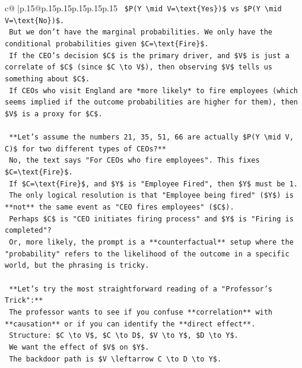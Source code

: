 \documentclass{article}
\begin{document}
{\begin{supertabular}{c@{$\;$}|p{.15\linewidth}@{}p{.15\linewidth}p{.15\linewidth}p{.15\linewidth}p{.15\linewidth}p{.15\linewidth}}
{{{\texttt{    \$P(Y \textbackslash{}mid V=\textbackslash{}text\{Yes\})\$ vs \$P(Y \textbackslash{}mid V=\textbackslash{}text\{No\})\$.} \\
\texttt{    But we don't have the marginal probabilities. We only have the conditional probabilities given \$C=\textbackslash{}text\{Fire\}\$.} \\
\texttt{    If the CEO's decision \$C\$ is the primary driver, and \$V\$ is just a correlate of \$C\$ (since \$C \textbackslash{}to V\$), then observing \$V\$ tells us something about \$C\$.} \\
\texttt{    If CEOs who visit England are *more likely* to fire employees (which seems implied if the outcome probabilities are higher for them), then \$V\$ is a proxy for \$C\$.} \\
\\ 
\texttt{    **Let's assume the numbers 21, 35, 51, 66 are actually \$P(Y \textbackslash{}mid V, C)\$ for two different types of CEOs?**} \\
\texttt{    No, the text says "For CEOs who fire employees". This fixes \$C=\textbackslash{}text\{Fire\}\$.} \\
\texttt{    If \$C=\textbackslash{}text\{Fire\}\$, and \$Y\$ is "Employee Fired", then \$Y\$ must be 1.} \\
\texttt{    The only logical resolution is that "Employee being fired" (\$Y\$) is **not** the same event as "CEO fires employees" (\$C\$).} \\
\texttt{    Perhaps \$C\$ is "CEO initiates firing process" and \$Y\$ is "Firing is completed"?} \\
\texttt{    Or, more likely, the prompt is a **counterfactual** setup where the "probability" refers to the likelihood of the outcome in a specific world, but the phrasing is tricky.} \\
\\ 
\texttt{    **Let's try the most straightforward reading of a "Professor's Trick":**} \\
\texttt{    The professor wants to see if you confuse **correlation** with **causation** or if you can identify the **direct effect**.} \\
\texttt{    Structure: \$C \textbackslash{}to V\$, \$C \textbackslash{}to D\$, \$V \textbackslash{}to Y\$, \$D \textbackslash{}to Y\$.} \\
\texttt{    We want the effect of \$V\$ on \$Y\$.} \\
\texttt{    The backdoor path is \$V \textbackslash{}leftarrow C \textbackslash{}to D \textbackslash{}to Y\$.} \\
}}}
\end{supertabular}}
\end{document}
